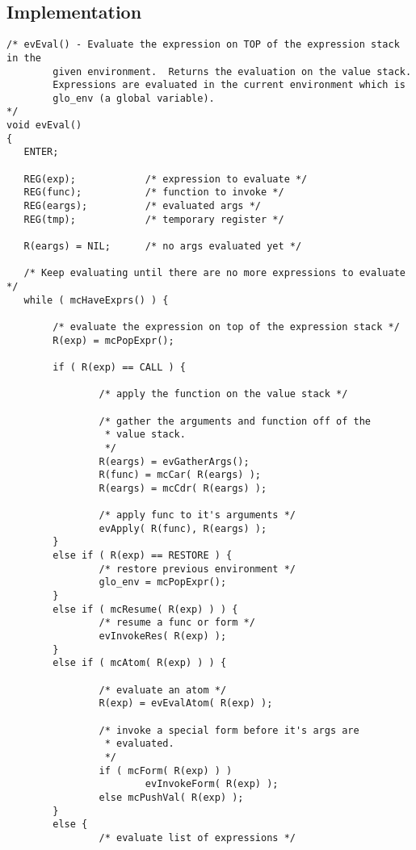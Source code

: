    \subsection{Implementation}

\begin{verbatim}
/* evEval() - Evaluate the expression on TOP of the expression stack in the
        given environment.  Returns the evaluation on the value stack.
        Expressions are evaluated in the current environment which is
        glo_env (a global variable).
*/
void evEval()
{
   ENTER;

   REG(exp);            /* expression to evaluate */
   REG(func);           /* function to invoke */
   REG(eargs);          /* evaluated args */
   REG(tmp);            /* temporary register */

   R(eargs) = NIL;      /* no args evaluated yet */

   /* Keep evaluating until there are no more expressions to evaluate */
   while ( mcHaveExprs() ) {

        /* evaluate the expression on top of the expression stack */
        R(exp) = mcPopExpr();

        if ( R(exp) == CALL ) {

                /* apply the function on the value stack */

                /* gather the arguments and function off of the
                 * value stack.
                 */
                R(eargs) = evGatherArgs();
                R(func) = mcCar( R(eargs) );
                R(eargs) = mcCdr( R(eargs) );

                /* apply func to it's arguments */
                evApply( R(func), R(eargs) );
        }
        else if ( R(exp) == RESTORE ) {
                /* restore previous environment */
                glo_env = mcPopExpr();
        }
        else if ( mcResume( R(exp) ) ) {
                /* resume a func or form */
                evInvokeRes( R(exp) );
        }
        else if ( mcAtom( R(exp) ) ) {

                /* evaluate an atom */
                R(exp) = evEvalAtom( R(exp) );

                /* invoke a special form before it's args are
                 * evaluated.
                 */
                if ( mcForm( R(exp) ) )
                        evInvokeForm( R(exp) );
                else mcPushVal( R(exp) );
        }
        else {
                /* evaluate list of expressions */


\end{verbatim}
